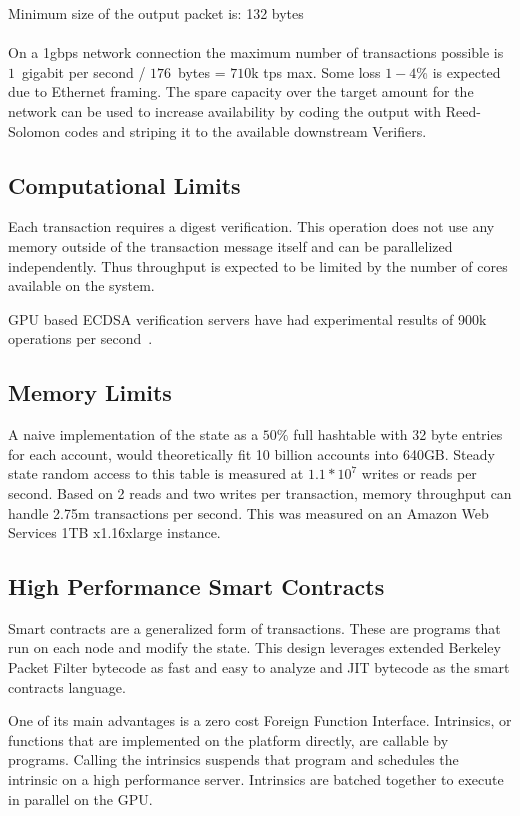 \documentclass[12pt]{article}
\begin{document}
\noindent Minimum size of the output packet is: 132 bytes \\\\

On a 1gbps network connection the maximum number of transactions possible is $1$~gigabit per second / $176$~bytes = $710$k tps max. Some loss $1-4\%$ is expected due to Ethernet framing. The spare capacity over the target amount for the network can be used to increase availability by coding the output with Reed-Solomon codes and striping it to the available downstream Verifiers.
\subsection{Computational Limits}
Each transaction requires a digest verification. This operation does not use any memory outside of the transaction message itself and can be parallelized independently. Thus throughput is expected to be limited by the number of cores available on the system.

GPU based ECDSA verification servers have had experimental results of 900k operations per second~\cite{gpuecc}.
\subsection{Memory Limits}
A naive implementation of the state as a \(50\%\) full hashtable with 32 byte entries for each account, would theoretically fit 10 billion accounts into 640GB. Steady state random access to this table is measured at \(1.1 * 10^7\) writes or reads per second. Based on 2 reads and two writes per transaction, memory throughput can handle 2.75m transactions per second. This was measured on an Amazon Web Services 1TB x1.16xlarge instance.

\subsection{High Performance Smart Contracts}\label{sec:smartcontracts}

Smart contracts are a generalized form of transactions. These are programs that run on each node and modify the state. This design leverages extended Berkeley Packet Filter bytecode as fast and easy to analyze and JIT bytecode as the smart contracts language.

One of its main advantages is a zero cost Foreign Function Interface. Intrinsics, or  functions that are implemented on the platform directly, are callable by  programs. Calling the intrinsics suspends that program and schedules the intrinsic on a high performance server. Intrinsics are batched together to execute in parallel on the GPU.
\end{document}
